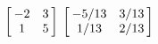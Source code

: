 {$\left[\hskip -3pt \begin{array}{cc} -2&3\\  1&5\end {array} \hskip -3pt
 \right] $
 }
{$\left[\hskip -3pt \begin{array}{cc} -5/13&3/13\\  1/13&2/13\end {array} \hskip -3pt
 \right] $}
